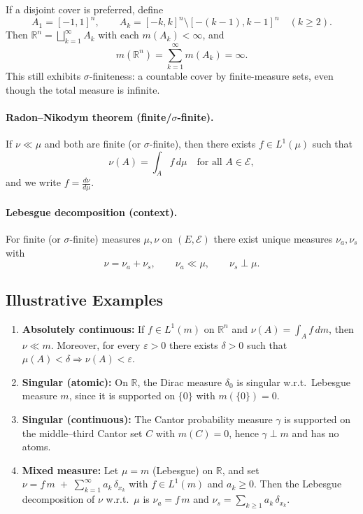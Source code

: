 \documentclass[12pt,a4paper]{article}
\theoremstyle{plain}
\theoremstyle{definition}
\theoremstyle{remark}
\theoremstyle{remark}
\theoremstyle{definition}
\begin{document}
	\medskip
	
	If a disjoint cover is preferred, define
	\[
	A_1=[-1,1]^n,\qquad
	A_k=[-k,k]^n\setminus[-(k-1),k-1]^n\quad (k\ge2).
	\]
	Then $\mathbb{R}^n=\bigsqcup_{k=1}^\infty A_k$ with each $m(A_k)<\infty$, and
	\[
	m(\mathbb{R}^n)=\sum_{k=1}^\infty m(A_k)=\infty.
	\]
	This still exhibits $\sigma$-finiteness: a countable cover by finite-measure sets, even though the total measure is infinite.
	
	
	\bigskip
	
	\paragraph{Radon--Nikodym theorem (finite/$\sigma$-finite).}
	If $\nu\ll\mu$ and both are finite (or $\sigma$-finite), then there exists $f\in L^1(\mu)$ such that
	\[
	\nu(A)=\int_A f\,d\mu \quad \text{for all }A\in\mathcal E,
	\]
	and we write $f=\frac{d\nu}{d\mu}$.
	
	\bigskip
	
	\paragraph{Lebesgue decomposition (context).}
	For finite (or $\sigma$-finite) measures $\mu,\nu$ on $(E,\mathcal E)$ there exist unique measures
	$\nu_a,\nu_s$ with
	\[
	\nu=\nu_a+\nu_s,\qquad \nu_a\ll\mu,\qquad \nu_s\perp\mu.
	\]
	
	\bigskip
	
	\subsection*{Illustrative Examples}
	
	\begin{enumerate}
		\item \textbf{Absolutely continuous:}
		If $f\in L^1(m)$ on $\mathbb R^n$ and $\nu(A)=\int_A f\,dm$, then $\nu\ll m$.
		Moreover, for every $\varepsilon>0$ there exists $\delta>0$ such that
		$\mu(A)<\delta\Rightarrow \nu(A)<\varepsilon$.
		
		\item \textbf{Singular (atomic):}
		On $\mathbb R$, the Dirac measure $\delta_0$ is singular w.r.t.\ Lebesgue measure $m$,
		since it is supported on $\{0\}$ with $m(\{0\})=0$.
		
		\item \textbf{Singular (continuous):}
		The Cantor probability measure $\gamma$ is supported on the middle--third Cantor set $C$ with $m(C)=0$,
		hence $\gamma\perp m$ and has no atoms.
		
		\item \textbf{Mixed measure:}
		Let $\mu=m$ (Lebesgue) on $\mathbb R$, and set
		$\displaystyle \nu = f\,m \;+\; \sum_{k=1}^\infty a_k\,\delta_{x_k}$
		with $f\in L^1(m)$ and $a_k\ge0$.
		Then the Lebesgue decomposition of $\nu$ w.r.t.\ $\mu$ is
		$\nu_a=f\,m$ and $\nu_s=\sum_{k\ge1} a_k\,\delta_{x_k}$.
	\end{enumerate}
	
\end{document}
